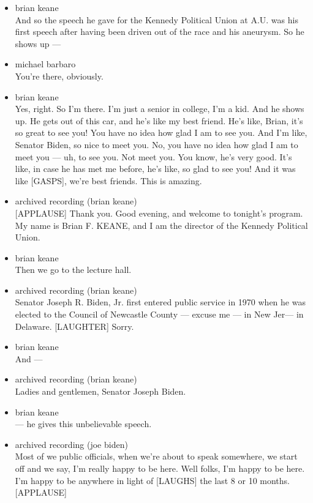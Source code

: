 \begin{itemize}
\item
  brian keane\\
  And so the speech he gave for the Kennedy Political Union at A.U. was
  his first speech after having been driven out of the race and his
  aneurysm. So he shows up ---
\item
  michael barbaro\\
  You're there, obviously.
\item
  brian keane\\
  Yes, right. So I'm there. I'm just a senior in college, I'm a kid. And
  he shows up. He gets out of this car, and he's like my best friend.
  He's like, Brian, it's so great to see you! You have no idea how glad
  I am to see you. And I'm like, Senator Biden, so nice to meet you. No,
  you have no idea how glad I am to meet you --- uh, to see you. Not
  meet you. You know, he's very good. It's like, in case he has met me
  before, he's like, so glad to see you! And it was like {[}GASPS{]},
  we're best friends. This is amazing.
\item
  archived recording (brian keane)\\
  {[}APPLAUSE{]} Thank you. Good evening, and welcome to tonight's
  program. My name is Brian F. KEANE, and I am the director of the
  Kennedy Political Union.
\item
  brian keane\\
  Then we go to the lecture hall.
\item
  archived recording (brian keane)\\
  Senator Joseph R. Biden, Jr. first entered public service in 1970 when
  he was elected to the Council of Newcastle County --- excuse me --- in
  New Jer--- in Delaware. {[}LAUGHTER{]} Sorry.
\item
  brian keane\\
  And ---
\item
  archived recording (brian keane)\\
  Ladies and gentlemen, Senator Joseph Biden.
\item
  brian keane\\
  --- he gives this unbelievable speech.
\item
  archived recording (joe biden)\\
  Most of we public officials, when we're about to speak somewhere, we
  start off and we say, I'm really happy to be here. Well folks, I'm
  happy to be here. I'm happy to be anywhere in light of {[}LAUGHS{]}
  the last 8 or 10 months. {[}APPLAUSE{]}

\end{itemize}
